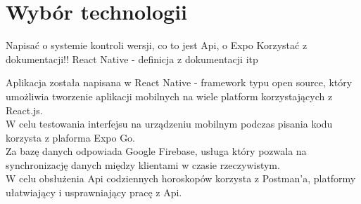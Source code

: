 \section{Wybór technologii}

Napisać o systemie kontroli wersji, co to jest Api, o Expo
Korzystać z dokumentacji!!  React Native - definicja z dokumentacji itp

\phantom{Th} 

Aplikacja została napisana w React Native - framework typu open source, który umożliwia tworzenie aplikacji mobilnych na wiele platform korzystających z React.js.\\
 
W celu testowania interfejsu na urządzeniu mobilnym podczas pisania kodu korzysta z plaforma Expo Go.\\

Za bazę danych odpowiada Google Firebase, usługa który pozwala na synchronizację danych między klientami w czasie rzeczywistym.\\

W celu obsłużenia Api codziennych horoskopów korzysta z Postman’a, platformy ułatwiający i usprawniający pracę z Api.\\
